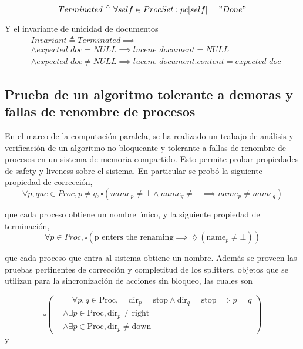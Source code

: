 \documentclass[runningheads]{llncs}
\begin{document}
\begin{equation}
    Terminated \triangleq \forall self \in ProcSet: pc[self] = "Done"
\end{equation}

Y el invariante de unicidad de documentos
\begin{align*}
    & Invariant \triangleq Terminated \implies \\
    & \land expected\_doc = NULL \implies lucene\_document = NULL \\ 
    & \land expected\_doc \neq NULL \implies lucene\_document.content = expected\_doc
\end{align*}

\subsection{Prueba de un algoritmo tolerante a demoras y fallas de renombre de procesos}
En el marco de la computación paralela, se ha realizado un trabajo \cite{case_study} de análisis y verificación de un algoritmo no bloqueante y tolerante a fallas de renombre de procesos en un sistema de memoria compartido. Esto permite probar propiedades de safety y liveness sobre el sistema. En particular se probó la siguiente propiedad de corrección, 
\begin{equation}
    \forall p, que \in Proc, p \neq q, \square(name_p \neq \bot \land name_q \neq \bot \implies name_p \neq name_q)
\end{equation}

que cada proceso obtiene un nombre único, y la siguiente propiedad de terminación,
\begin{equation}
    \forall p \in Proc, \square(\text{p enters the renaming} \implies \lozenge (\text{name}_p \neq \bot))
\end{equation}

que cada proceso que entra al sistema obtiene un nombre.
Además se proveen las pruebas pertinentes de corrección y completitud de los splitters, objetos que se utilizan para la sincronización de acciones sin bloqueo,  las cuales son

\[
\square \left( \begin{aligned}
    &\phantom{\land} \forall p,q \in \text{Proc}, \phantom{\land} \text{dir}_p = \text{stop} \land \text{dir}_q = \text{stop} \implies p = q \\
    &\land \exists p \in \text{Proc}, \text{dir}_p \neq \text{right} \\
    &\land \exists p \in \text{Proc}, \text{dir}_p \neq \text{down}
\end{aligned} \right)
\]
y
\end{document}
